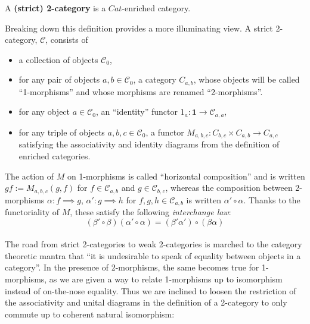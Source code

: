 \begin{defn}
  A \textbf{(strict) 2-category} is a $Cat$-enriched category.
\end{defn}
Breaking down this definition provides a more illuminating view. A strict 2-category, $\mathcal{C}$, consists of
\begin{itemize}
\item a collection of objects $\mathcal{C}_0$,
\item for any pair of objects $a, b \in \mathcal{C}_0$, a category $C_{a, b}$, whose objects will be called ``1-morphisms'' and whose morphisms are renamed ``2-morphisms''.
\item for any object $a \in \mathcal{C}_0$, an ``identity'' functor $1_a : \mathbf{1} \to \mathcal{C}_{a, a}$, 
\item for any triple of objects $a, b, c \in \mathcal{C}_0$, a functor $M_{a,b,c} : C_{b, c} \times C_{a, b} \to C_{a, c}$
  satisfying the associativity and identity diagrams from the definition of enriched categories.
\end{itemize}
The action of $M$ on 1-morphisms is called ``horizontal composition'' and is written $gf := M_{a,b,c}(g, f)$ for $f \in \mathcal{C}_{a, b}$ and $g \in \mathcal{C}_{b, c}$, whereas the composition between 2-morphisms $\alpha : f \implies g$, $\alpha' : g \implies h$ for $f, g, h \in \mathcal{C}_{a, b}$ is written $\alpha' \circ \alpha$.
Thanks to the functoriality of $M$, these satisfy the following \textit{interchange law}:
\[
  (\beta' \circ \beta)(\alpha'\circ \alpha)=(\beta'\alpha')\circ(\beta\alpha)
\]\\
The road from strict 2-categories to weak 2-categories is marched to the category theoretic mantra that ``it is undesirable to speak of equality between objects in a category''. In the presence of 2-morphisms, the same becomes true for 1-morphisms, as we are given a way to relate 1-morphisms up to isomorphism instead of on-the-nose equality. Thus we are inclined to loosen the restriction of the associativity and unital diagrams in the definition of a 2-category to only commute up to coherent natural isomorphism:
